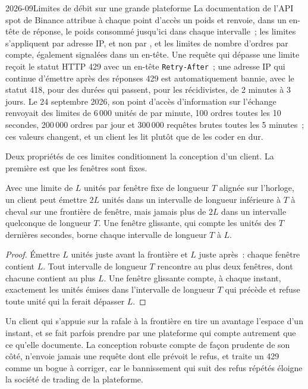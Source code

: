 \begin{dated}{2026-09}{Limites de débit sur une grande plateforme}\label{dat:m3:centralised-exchanges:limits}
La documentation de l'API spot de Binance attribue à chaque point d'accès un poids et renvoie, dans un en-tête de réponse, le poids consommé jusqu'ici
dans chaque intervalle~; les limites s'appliquent par adresse IP, et non par , et les limites de nombre d'ordres
par compte, également signalées dans un en-tête. Une requête qui dépasse une limite reçoit le statut HTTP 429
avec un en-tête \texttt{Retry-After}~; une adresse IP qui continue d'émettre après des réponses 429 est automatiquement
bannie, avec le statut 418, pour des durées qui passent, pour les récidivistes, de 2 minutes à 3 jours. Le 24
septembre 2026, son point d'accès d'information sur l'échange renvoyait des limites de 6\,000 unités de  par
minute, 100 ordres toutes les 10 secondes, 200\,000 ordres par jour et 300\,000 requêtes brutes toutes les 5 minutes~;
ces valeurs changent, et un client les lit plutôt que de les coder en dur.
\end{dated}

Deux propriétés de ces limites conditionnent la conception d'un client. La première est que les fenêtres sont fixes.

\begin{proposition}\label{prop:m3:centralised-exchanges:burst}
Avec une limite de $L$ unités par fenêtre fixe de longueur $T$ alignée sur l'horloge, un client peut émettre $2L$
unités dans un intervalle de longueur inférieure à $T$ à cheval sur une frontière de fenêtre, mais jamais plus de
$2L$ dans un intervalle quelconque de longueur $T$. Une fenêtre glissante, qui compte les unités des $T$
dernières secondes, borne chaque intervalle de longueur $T$ à $L$.
\end{proposition}

\begin{proof}
Émettre $L$ unités juste avant la frontière et $L$ juste après~: chaque fenêtre contient $L$. Tout intervalle de
longueur $T$ rencontre au plus deux fenêtres, dont chacune contient au plus $L$. Une fenêtre glissante compte, à
chaque instant, exactement les unités émises dans l'intervalle de longueur $T$ qui précède et refuse toute unité qui
la ferait dépasser $L$.
\end{proof}

Un client qui s'appuie sur la rafale à la frontière en tire un avantage l'espace d'un instant, et se fait parfois
prendre par une plateforme qui compte autrement que ce qu'elle documente. La conception robuste compte de façon
prudente de son côté, n'envoie jamais une requête dont elle prévoit le refus, et traite un 429 comme un bogue à
corriger, car le bannissement qui suit des refus répétés éloigne la société de trading de la plateforme.

